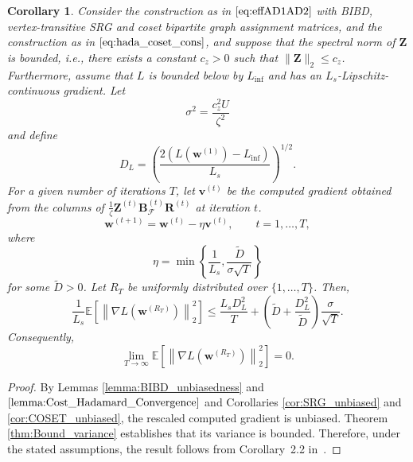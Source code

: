 \documentclass[journal,draftcls,onecolumn]{IEEEtran}
\theoremstyle{mystyle}
\newtheorem{cor}{Corollary}
\newcommand{\cF}{\mathcal{F}}
\begin{document}
\begin{cor}
Consider the construction as in $\eqref{eq:effAD1AD2}$ with BIBD, vertex-transitive SRG and coset bipartite graph assignment matrices, and the construction as in $\eqref{eq:hada_coset_cons}$,
and suppose that the spectral norm of $\mathbf{Z}$ is bounded, i.e.,
there exists a constant $c_z>0$ such that $\|\mathbf{Z}\|_2\leq c_z$. Furthermore, assume that $L$ is bounded below by $L_{\inf}$ and has
an $L_s$-Lipschitz-continuous gradient. Let
\begin{equation}
\sigma^2=\frac{c_z^2U}{\zeta^2}
\end{equation}
and define
\begin{equation}
D_L
=
\left(
\frac{2\left(L(\mathbf w^{(1)})-L_{\inf}\right)}
{L_s}
\right)^{1/2}.
\end{equation}
For a given number of iterations $T$, let $\mathbf{v}^{(t)}$ be the computed gradient obtained from the columns of $\frac{1}{\zeta}\mathbf{Z}^{(t)}\mathbf{B}_{\cF}^{(t)}\mathbf{R}^{(t)}$ at iteration $t$.
\begin{equation}
\mathbf w^{(t+1)}
=
\mathbf w^{(t)}
-
\eta
\mathbf{v}^{(t)},
\qquad t=1,\ldots,T,
\end{equation}
where
\begin{equation}
\eta
=
\min\left\{
\frac{1}{L_s},
\frac{\widetilde D}{\sigma\sqrt{T}}
\right\}
\end{equation}
for some $\widetilde D>0$. Let $R_T$ be uniformly distributed over
$\{1,\ldots,T\}$. Then,
\begin{equation}
\frac{1}{L_s}
\mathbb E
\left[
\left\|
\nabla L\left(\mathbf w^{(R_T)}\right)
\right\|_2^2
\right]
\leq
\frac{L_sD_L^2}{T}
+
\left(
\widetilde D+\frac{D_L^2}{\widetilde D}
\right)
\frac{\sigma}{\sqrt{T}}.
\end{equation}
Consequently,
\begin{equation}
\lim_{T\rightarrow\infty}
\mathbb E
\left[
\left\|
\nabla L\left(\mathbf w^{(R_T)}\right)
\right\|_2^2
\right]
=0.
\end{equation}
\end{cor}

\begin{proof}
By Lemmas \ref{lemma:BIBD_unbiasedness} and $\ref{lemma:Cost_Hadamard_Convergence}$ and Corollaries \ref{cor:SRG_unbiased} and \ref{cor:COSET_unbiased}, the
rescaled computed gradient is unbiased. Theorem \ref{thm:Bound_variance} establishes that its variance is bounded. Therefore, under the stated assumptions, the result follows from
Corollary~2.2 in~\cite{doi:10.1137/120880811}.
\end{proof}
\end{document}
